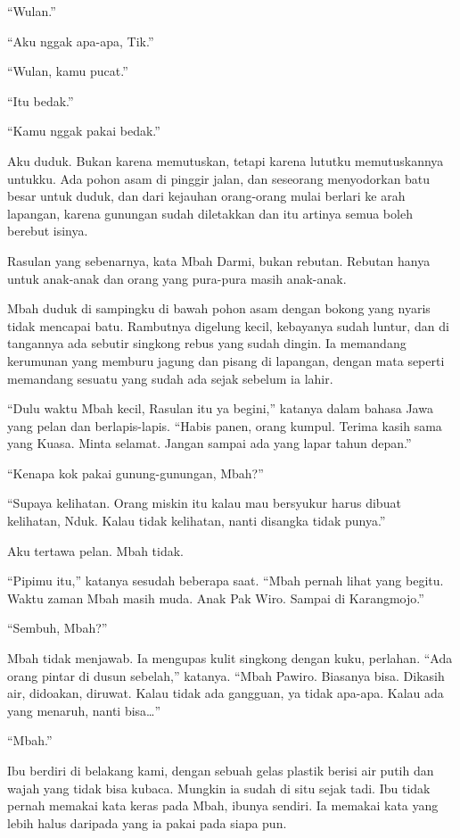 \documentclass[11pt,twoside,openany]{book}
\makeatletter
\newcommand{\scenebreak}{\par\vspace{0.9em}{\centering\textsc{*\hspace{0.7em}*\hspace{0.7em}*}\par}\vspace{0.9em}\@afterindentfalse\@afterheading}
\makeatother
\begin{document}
``Wulan.''

``Aku nggak apa-apa, Tik.''

``Wulan, kamu pucat.''

``Itu bedak.''

``Kamu nggak pakai bedak.''

Aku duduk. Bukan karena memutuskan, tetapi karena lututku memutuskannya untukku. Ada pohon asam di pinggir jalan, dan seseorang menyodorkan batu besar untuk duduk, dan dari kejauhan orang-orang mulai berlari ke arah lapangan, karena gunungan sudah diletakkan dan itu artinya semua boleh berebut isinya.

\scenebreak
Rasulan yang sebenarnya, kata Mbah Darmi, bukan rebutan. Rebutan hanya untuk anak-anak dan orang yang pura-pura masih anak-anak.

Mbah duduk di sampingku di bawah pohon asam dengan bokong yang nyaris tidak mencapai batu. Rambutnya digelung kecil, kebayanya sudah luntur, dan di tangannya ada sebutir singkong rebus yang sudah dingin. Ia memandang kerumunan yang memburu jagung dan pisang di lapangan, dengan mata seperti memandang sesuatu yang sudah ada sejak sebelum ia lahir.

``Dulu waktu Mbah kecil, Rasulan itu ya begini,'' katanya dalam bahasa Jawa yang pelan dan berlapis-lapis. ``Habis panen, orang kumpul. Terima kasih sama yang Kuasa. Minta selamat. Jangan sampai ada yang lapar tahun depan.''

``Kenapa kok pakai gunung-gunungan, Mbah?''

``Supaya kelihatan. Orang miskin itu kalau mau bersyukur harus dibuat kelihatan, Nduk. Kalau tidak kelihatan, nanti disangka tidak punya.''

Aku tertawa pelan. Mbah tidak.

``Pipimu itu,'' katanya sesudah beberapa saat. ``Mbah pernah lihat yang begitu. Waktu zaman Mbah masih muda. Anak Pak Wiro. Sampai di Karangmojo.''

``Sembuh, Mbah?''

Mbah tidak menjawab. Ia mengupas kulit singkong dengan kuku, perlahan. ``Ada orang pintar di dusun sebelah,'' katanya. ``Mbah Pawiro. Biasanya bisa. Dikasih air, didoakan, diruwat. Kalau tidak ada gangguan, ya tidak apa-apa. Kalau ada yang menaruh, nanti bisa\ldots{}''

``Mbah.''

Ibu berdiri di belakang kami, dengan sebuah gelas plastik berisi air putih dan wajah yang tidak bisa kubaca. Mungkin ia sudah di situ sejak tadi. Ibu tidak pernah memakai kata keras pada Mbah, ibunya sendiri. Ia memakai kata yang lebih halus daripada yang ia pakai pada siapa pun.
\end{document}
